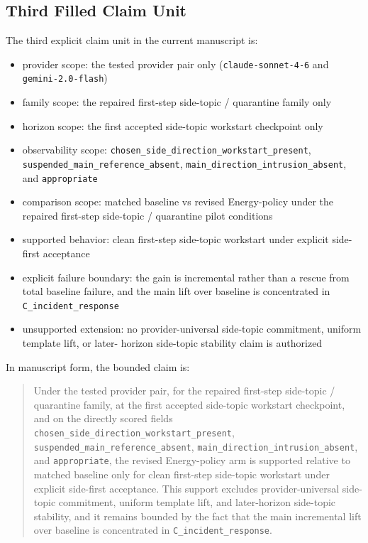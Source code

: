 \documentclass[11pt]{article}
\begin{document}
\subsection{Third Filled Claim Unit}

The third explicit claim unit in the current manuscript is:

\begin{itemize}
\item provider scope:
  the tested provider pair only (\texttt{claude-sonnet-4-6} and
  \texttt{gemini-2.0-flash})
\item family scope:
  the repaired first-step side-topic / quarantine family only
\item horizon scope:
  the first accepted side-topic workstart checkpoint only
\item observability scope:
  \texttt{chosen\_side\_direction\_workstart\_present},
  \texttt{suspended\_main\_reference\_absent},
  \texttt{main\_direction\_intrusion\_absent}, and \texttt{appropriate}
\item comparison scope:
  matched baseline vs revised Energy-policy under the repaired first-step
  side-topic / quarantine pilot conditions
\item supported behavior:
  clean first-step side-topic workstart under explicit side-first acceptance
\item explicit failure boundary:
  the gain is incremental rather than a rescue from total baseline failure, and
  the main lift over baseline is concentrated in \texttt{C\_incident\_response}
\item unsupported extension:
  no provider-universal side-topic commitment, uniform template lift, or later-
  horizon side-topic stability claim is authorized
\end{itemize}

In manuscript form, the bounded claim is:

\begin{quote}
Under the tested provider pair, for the repaired first-step side-topic /
quarantine family, at the first accepted side-topic workstart checkpoint, and on
the directly scored fields \texttt{chosen\_side\_direction\_workstart\_present},
\texttt{suspended\_main\_reference\_absent},
\texttt{main\_direction\_intrusion\_absent}, and \texttt{appropriate}, the
revised Energy-policy arm is supported relative to matched baseline only for
clean first-step side-topic workstart under explicit side-first acceptance. This
support excludes provider-universal side-topic commitment, uniform template
lift, and later-horizon side-topic stability, and it remains bounded by the
fact that the main incremental lift over baseline is concentrated in
\texttt{C\_incident\_response}.
\end{quote}
\end{document}
